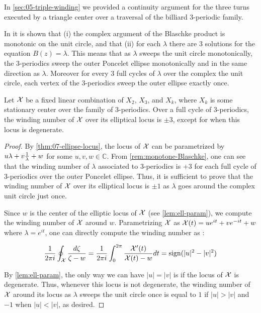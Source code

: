 In \cref{sec:05-triple-winding} we provided a continuity argument for the three turns executed by a triangle center over a traversal of the billiard 3-periodic family.

\begin{remark}
In \cite[Lemma 3.4, p. 28]{daepp-2019} it is shown that (i) the complex argument of the Blaschke product is monotonic on the unit circle, and that (ii) for each $\lambda$ there are 3 solutions for the equation $B(z)=\lambda$. This means that as $\lambda$ sweeps the unit circle monotonically, the 3-periodics sweep the outer Poncelet ellipse monotonically and in the same direction as $\lambda$. Moreover for every 3 full cycles of $\lambda$ over the complex the unit circle, each vertex of the 3-periodics sweep the outer ellipse exactly once.
\label{rem:monotone-Blaschke}
\end{remark}

\begin{proposition}
Let $\mathcal{X}$ be a fixed linear combination of $X_2$, $X_3$, and $X_k$, where $X_k$ is some stationary center over the family of 3-periodics. Over a full cycle of 3-periodics, the winding number of $\mathcal{X}$ over its elliptical locus is $\pm 3$, except for when this locus is degenerate.
\end{proposition}



\begin{proof}
By \cref{thm:07-ellipse-locus}, the locus of $\mathcal{X}$ can be parametrized by $u \lambda+v\frac{1}{\lambda}+w$ for some $u,v,w\in\mathbb{C}$. From \cref{rem:monotone-Blaschke}, one can see that the winding number of $\lambda$ associated to 3-periodics is $+3$ for each full cycle of 3-periodics over the outer Poncelet ellipse. Thus, it is sufficient to prove that the winding number of $\mathcal{X}$ over its elliptical locus is $\pm 1$ as $\lambda$ goes around the complex unit circle just once.

Since $w$ is the center of the elliptic locus of $\mathcal{X}$ (see \cref{lem:ell-param}), we compute the winding number of $\mathcal{X}$ around $w$. Parametrizing $\mathcal{X}$ as $\mathcal{X}(t)=u e^{i t}+v e^{-i t}+w$ where $\lambda=e^{i t}$, one can directly compute the winding number as \cite[Lemma 1, p. 114]{ahlfors1979-complex}:

\[
    \frac{1}{2\pi i}\oint_{\mathcal{X}}\frac{d\zeta}{\zeta-w}=\frac{1}{2\pi i}\int_0^{2\pi} \frac{\mathcal{X}'(t)}{\mathcal{X}(t)-w}d t={\mathop{\mathrm{sign}}}(|u|^2-|v|^2)
\]

By \cref{lem:ell-param}, the only way we can have $|u|=|v|$ is if the locus of $\mathcal{X}$ is degenerate. Thus, whenever this locus is not degenerate, the winding number of $\mathcal{X}$ around its locus as $\lambda$ sweeps the unit circle once is equal to $1$ if $|u|>|v|$ and $-1$ when $|u|<|v|$, as desired.
\end{proof}
